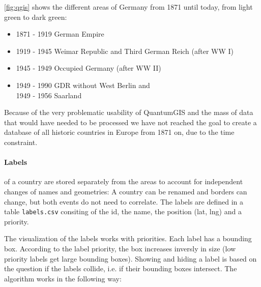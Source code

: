 \ref{fig:qgis} shows the different areas of Germany from 1871 until today, from light green to dark green:

\begin{itemize}
  \item 1871 - 1919 German Empire
  \item 1919 - 1945 Weimar Republic and Third German Reich (after WW I)
  \item 1945 - 1949 Occupied Germany (after WW II)
  \item 1949 - 1990 GDR without West Berlin and \\
        1949 - 1956 Saarland
\end{itemize}

Because of the very problematic usability of QuantumGIS and the mass of data that would have needed to be processed we have not reached the goal to create a database of all historic countries in Europe from 1871 on, due to the time constraint.

\paragraph{Labels} of a country are stored separately from the areas to account for independent changes of names and geometries: A country can be renamed and borders can change, but both events do not need to correlate. The labels are defined in a table \texttt{labels.csv} consiting of the id, the name, the position (lat, lng) and a priority.

\newpage
The visualization of the labels works with priorities. Each label has a bounding box. According to the label priority, the box increases inversly in size (low priority labels get large bounding boxes). Showing and hiding a label is based on the question if the labels collide, i.e. if their bounding boxes intersect. The algorithm works in the following way:

